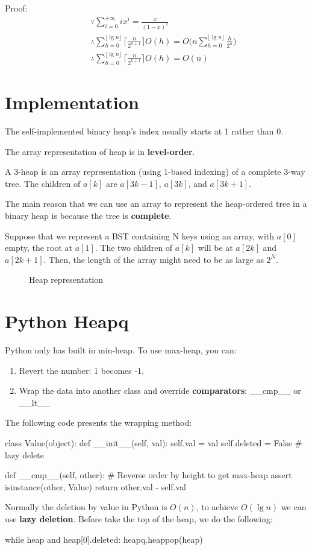 Proof:
\begin{eqnarray*}
&& \because \sum_{i=0}^{+\infty} {ix^i} =\frac{x}{(1-x)^2} \\
&& \therefore \sum_{h=0}^{\lfloor\lg n\rfloor}{\Big\lceil\frac{n}{2^{h+1}}\Big\rceil
O(h)} = O\Bigg(n\sum_{h=0}^{\lfloor\lg n\rfloor}{\frac{h}{2^h}}\Bigg) \\
&& \therefore \sum_{h=0}^{\lfloor\lg n\rfloor}{\Big\lceil\frac{n}{2^{h+1}}\Big\rceil
O(h)} = O(n)
\end{eqnarray*}

\section{Implementation}
The self-implemented binary heap's index usually starts at 1 rather than 0. 

The array representation of heap is in \textbf{level-order}.

A 3-heap is an array representation (using 1-based indexing) of a complete 3-way tree. The children of $a[k]$ are $a[3k-1]$, $a[3k]$, and $a[3k+1]$.

The main reason that we can use an array to represent the heap-ordered tree in a binary heap is because the tree is \textbf{complete}.

Suppose that we represent a BST containing N keys using an array, with $a[0]$ empty, the root at $a[1]$. The two children of $a[k]$ will be at $a[2k]$ and $a[2k+1]$. Then, the length of the array might need to be as large as $2^N$.

\begin{figure}[hbtp]
\centering
{}
\caption{Heap representation}
\label{fig:heap} 
\end{figure}

\section{Python Heapq}
Python only has built in min-heap. To use max-heap, you can: 
\begin{enumerate}
\item Revert the number: 1 becomes -1.
\item Wrap the data into another class and override \textbf{comparators}: \_\_cmp\_\_ or \_\_lt\_\_
\end{enumerate}

The following code presents the wrapping method:
\begin{python}
class Value(object):
    def __init__(self, val):
        self.val = val
        self.deleted = False  # lazy delete 

    def __cmp__(self, other):
        # Reverse order by height to get max-heap
        assert isinstance(other, Value)
        return other.val - self.val
\end{python}

Normally the deletion by value in Python is $O(n)$, to achieve $O(\lg n)$ we can use \textbf{lazy deletion}. Before take the top of the heap, we do the following:
\begin{python}
while heap and heap[0].deleted:
    heapq.heappop(heap)
\end{python}
